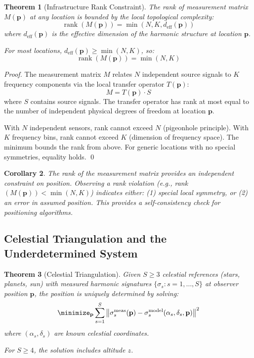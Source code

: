 \documentclass[11pt,twocolumn,a4paper]{article}
\newtheorem{theorem}{Theorem}[section]
\newtheorem{corollary}[theorem]{Corollary}
\theoremstyle{definition}
\DeclareMathOperator{\rank}{rank}
\begin{document}
\begin{theorem}[Infrastructure Rank Constraint]
\label{thm:rank}
The rank of measurement matrix $M(\mathbf{p})$ at any location is bounded by the local topological complexity:
\[
\rank(M(\mathbf{p})) = \min(N, K, d_{\text{eff}}(\mathbf{p}))
\]
where $d_{\text{eff}}(\mathbf{p})$ is the effective dimension of the harmonic structure at location $\mathbf{p}$.

For most locations, $d_{\text{eff}}(\mathbf{p}) \geq \min(N, K)$, so:
\[
\rank(M(\mathbf{p})) = \min(N, K)
\]
\end{theorem}

\begin{proof}
The measurement matrix $M$ relates $N$ independent source signals to $K$ frequency components via the local transfer operator $T(\mathbf{p})$:
\[
M = T(\mathbf{p}) \cdot S
\]
where $S$ contains source signals. The transfer operator has rank at most equal to the number of independent physical degrees of freedom at location $\mathbf{p}$.

With $N$ independent sensors, rank cannot exceed $N$ (pigeonhole principle). With $K$ frequency bins, rank cannot exceed $K$ (dimension of frequency space). The minimum bounds the rank from above. For generic locations with no special symmetries, equality holds. \qed
\end{proof}

\begin{corollary}
The rank of the measurement matrix provides an independent constraint on position. Observing a rank violation (e.g., rank$(M(\mathbf{p})) < \min(N,K)$) indicates either: (1) special local symmetry, or (2) an error in assumed position. This provides a self-consistency check for positioning algorithms.
\end{corollary}

\subsection{Celestial Triangulation and the Underdetermined System}

\begin{theorem}[Celestial Triangulation]
\label{thm:celestial}
Given $S \geq 3$ celestial references (stars, planets, sun) with measured harmonic signatures $\{\sigma_s : s = 1, \ldots, S\}$ at observer position $\mathbf{p}$, the position is uniquely determined by solving:
\[
\minimize_{\mathbf{p}} \sum_{s=1}^{S} \left\| \sigma_s^{\text{meas}}(\mathbf{p}) - \sigma_s^{\text{model}}(\alpha_s, \delta_s, \mathbf{p}) \right\|^2
\]
where $(\alpha_s, \delta_s)$ are known celestial coordinates.

For $S \geq 4$, the solution includes altitude $z$.
\end{theorem}
\end{document}
